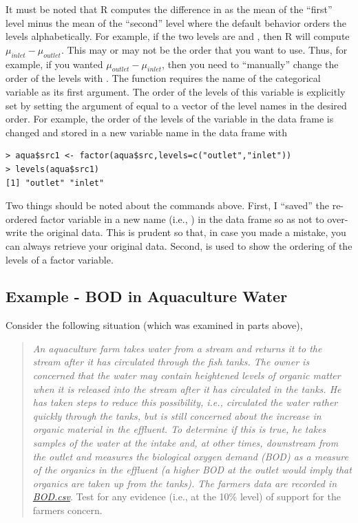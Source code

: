 \documentclass[10pt,openany]{book}\usepackage[]{graphicx}\usepackage[]{color}
\makeatletter
\newenvironment{kframe}{%
 \def\at@end@of@kframe{}%
 \ifinner\ifhmode%
  \def\at@end@of@kframe{\end{minipage}}%
  \begin{minipage}{\columnwidth}%
 \fi\fi%
 \def\FrameCommand##1{\hskip\@totalleftmargin \hskip-\fboxsep
 \colorbox{shadecolor}{##1}\hskip-\fboxsep
     \hskip-\linewidth \hskip-\@totalleftmargin \hskip\columnwidth}%
 \MakeFramed {\advance\hsize-\width
   \@totalleftmargin\z@ \linewidth\hsize
   \@setminipage}}%
 {\par\unskip\endMakeFramed%
 \at@end@of@kframe}
\newenvironment{knitrout}{}{} %
\makeatother
\begin{document}
It must be noted that R computes the difference in  as the mean of the ``first'' level minus the mean of the ``second'' level where the default behavior orders the levels alphabetically.  For example, if the two levels are  and , then R will compute $\mu_{inlet}-\mu_{outlet}$.  This may or may not be the order that you want to use.  Thus, for example, if you wanted $\mu_{outlet}-\mu_{inlet}$, then you need to ``manually'' change the order of the levels with .  The  function requires the name of the categorical variable as its first argument.  The order of the levels of this variable is explicitly set by setting the  argument of  equal to a vector of the level names in the desired order.  For example, the order of the levels of the  variable in the  data frame is changed and stored in a new variable name in the data frame with
\begin{knitrout}
\color{fgcolor}\begin{kframe}
\begin{verbatim}
> aqua$src1 <- factor(aqua$src,levels=c("outlet","inlet"))
> levels(aqua$src1)
[1] "outlet" "inlet" 
\end{verbatim}
\end{kframe}
\end{knitrout}
Two things should be noted about the commands above.  First, I ``saved'' the re-ordered factor variable in a new name (i.e., ) in the data frame so as not to over-write the original data.  This is prudent so that, in case you made a mistake, you can always retrieve your original data.  Second,  is used to show the ordering of the levels of a factor variable.

\subsection{Example - BOD in Aquaculture Water}
Consider the following situation (which was examined in parts above),
\begin{quote}
\textsl{An aquaculture farm takes water from a stream and returns it to the stream after it has circulated through the fish tanks.  The owner is concerned that the water may contain heightened levels of organic matter when it is released into the stream after it has circulated in the tanks.  He has taken steps to reduce this possibility, i.e., circulated the water rather quickly through the tanks, but is still concerned about the increase in organic material in the effluent.  To determine if this is true, he takes samples of the water at the intake and, at other times, downstream from the outlet and measures the biological oxygen demand (BOD) as a measure of the organics in the effluent (a higher BOD at the outlet would imply that organics are taken up from the tanks).  The farmers data are recorded in \href{https://raw.githubusercontent.com/droglenc/NCData/master/BOD.csv}{BOD.csv}}.  Test for any evidence (i.e., at the 10\% level) of support for the farmers concern.
\end{quote}
\end{document}
